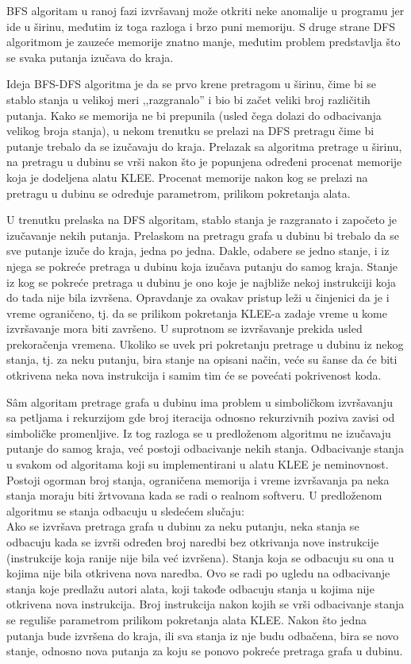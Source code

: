 \documentclass[12pt,oneside]{memoir}
\begin{document}
BFS algoritam u ranoj fazi izvršavanj može otkriti neke anomalije u programu jer ide u širinu, međutim iz toga razloga i brzo puni memoriju. S druge strane DFS algoritmom je zauzeće memorije znatno manje, međutim problem predstavlja što se svaka putanja izučava do kraja. 

Ideja BFS-DFS algoritma je da se prvo krene pretragom u širinu, čime bi se stablo stanja u velikoj meri ,,razgranalo'' i bio bi začet veliki broj različitih putanja. Kako se memorija ne bi prepunila (usled čega dolazi do odbacivanja velikog broja stanja), u nekom trenutku se prelazi na DFS pretragu čime bi putanje trebalo da se izučavaju do kraja. Prelazak sa algoritma pretrage u širinu, na pretragu u dubinu se vrši nakon što je popunjena određeni procenat memorije koja je dodeljena alatu KLEE. Procenat memorije nakon kog se prelazi na pretragu u dubinu se određuje parametrom, prilikom pokretanja alata. 

U trenutku prelaska na DFS algoritam, stablo stanja je razgranato i započeto je izučavanje nekih putanja. Prelaskom na pretragu grafa u dubinu bi trebalo da se sve putanje izuče do kraja, jedna po jedna. Dakle, odabere se jedno stanje, i iz njega se pokreće pretraga u dubinu koja izučava putanju do samog kraja. Stanje iz kog se pokreće pretraga u dubinu je ono koje je najbliže nekoj instrukciji koja do tada nije bila izvršena. Opravdanje za ovakav pristup leži u činjenici da je i vreme ograničeno, tj. da se prilikom pokretanja KLEE-a zadaje vreme u kome izvršavanje mora biti završeno. U suprotnom se izvršavanje prekida usled prekoračenja vremena. Ukoliko se uvek pri pokretanju pretrage u dubinu iz nekog stanja, tj. za neku putanju, bira stanje na opisani način, veće su šanse da će biti otkrivena neka nova instrukcija i samim tim će se povećati pokrivenost koda. 

S\^am algoritam pretrage grafa u dubinu ima problem u simboličkom izvršavanju sa petljama i rekurzijom gde broj iteracija odnosno rekurzivnih poziva zavisi od simboličke promenljive. Iz tog razloga se u predloženom algoritmu ne izučavaju putanje do samog kraja, već postoji odbacivanje nekih stanja. Odbacivanje stanja u svakom od algoritama koji su implementirani u alatu KLEE je neminovnost. Postoji ogorman broj stanja, ograničena memorija i vreme izvršavanja pa neka stanja moraju biti žrtvovana kada se radi o realnom softveru. U predloženom algoritmu se stanja odbacuju u sledećem slučaju: \\
Ako se izvršava pretraga grafa u dubinu za neku putanju, neka stanja se odbacuju kada se izvrši određen broj naredbi bez otkrivanja nove instrukcije (instrukcije koja ranije nije bila već izvršena). Stanja koja se odbacuju su ona u kojima nije bila otkrivena nova naredba.
Ovo se radi po ugledu na odbacivanje stanja koje predlažu autori alata, koji takođe odbacuju stanja u kojima nije otkrivena nova instrukcija. Broj instrukcija nakon kojih se vrši odbacivanje stanja se reguliše parametrom prilikom pokretanja alata KLEE. Nakon što jedna putanja bude izvršena do kraja, ili sva stanja iz nje budu odbačena, bira se novo stanje, odnosno nova putanja za koju se ponovo pokreće pretraga grafa u dubinu.
\end{document}

